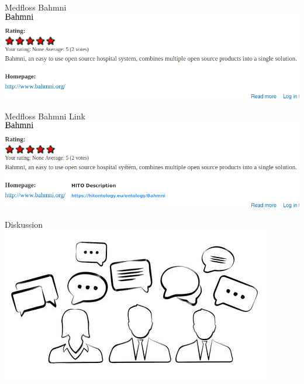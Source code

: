 \documentclass[aspectratio=1610,12pt]{beamer}
\begin{document}
\begin{frame}{Medfloss Bahmni}
  \includegraphics[width=\textwidth]{img/medfloss-bahmni.png}
\end{frame}

\begin{frame}{Medfloss Bahmni Link}
  \includegraphics[width=\textwidth]{img/medfloss-bahmni-link.png}
\end{frame}

\begin{frame}{Diskussion}
  \centering
  \vspace{-0.5cm}
  \includegraphics[width=\textwidth]{img/discussion.png}
\end{frame}
\end{document}
